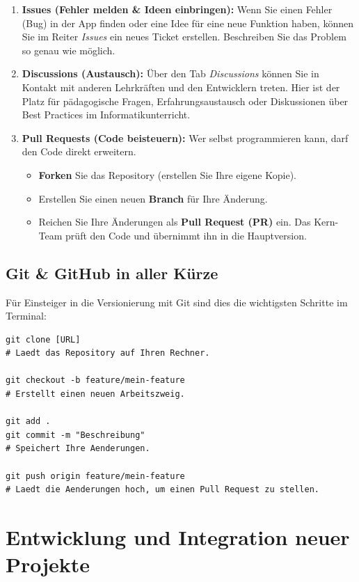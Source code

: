 \documentclass[a5paper,pagesize,10pt,bibtotoc,pointlessnumbers,
normalheadings,DIV=9,twoside=false]{scrbook}
\begin{document}
\begin{enumerate}
    \item \textbf{Issues (Fehler melden \& Ideen einbringen):} Wenn Sie einen Fehler (Bug) in der App finden oder eine Idee für eine neue Funktion haben, können Sie im Reiter \textit{Issues} ein neues Ticket erstellen. Beschreiben Sie das Problem so genau wie möglich.
    \item \textbf{Discussions (Austausch):} Über den Tab \textit{Discussions} können Sie in Kontakt mit anderen Lehrkräften und den Entwicklern treten. Hier ist der Platz für pädagogische Fragen, Erfahrungsaustausch oder Diskussionen über Best Practices im Informatikunterricht.
    \item \textbf{Pull Requests (Code beisteuern):} Wer selbst programmieren kann, darf den Code direkt erweitern.
    \begin{itemize}
        \item \textbf{Forken} Sie das Repository (erstellen Sie Ihre eigene Kopie).
        \item Erstellen Sie einen neuen \textbf{Branch} für Ihre Änderung.
        \item Reichen Sie Ihre Änderungen als \textbf{Pull Request (PR)} ein. Das Kern-Team prüft den Code und übernimmt ihn in die Hauptversion.
    \end{itemize}
\end{enumerate}

\subsection*{Git \& GitHub in aller Kürze}
Für Einsteiger in die Versionierung mit Git sind dies die wichtigsten Schritte im Terminal:

\begin{lstlisting}[style=bash]
git clone [URL] 
# Laedt das Repository auf Ihren Rechner.

git checkout -b feature/mein-feature 
# Erstellt einen neuen Arbeitszweig.

git add . 
git commit -m "Beschreibung" 
# Speichert Ihre Aenderungen.

git push origin feature/mein-feature 
# Laedt die Aenderungen hoch, um einen Pull Request zu stellen.
\end{lstlisting}

\section*{Entwicklung und Integration neuer Projekte}
\end{document}
